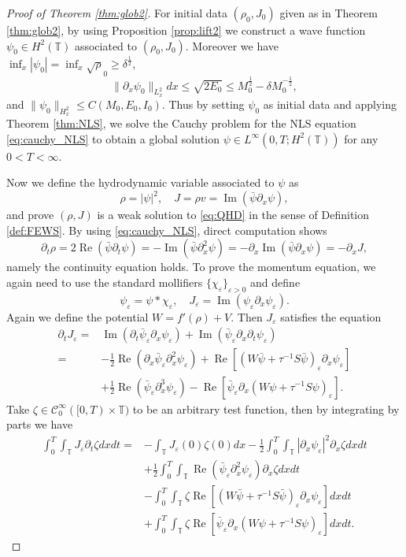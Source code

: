 \documentclass[leqno]{amsart}
\theoremstyle{plain}
\theoremstyle{definition}
\theoremstyle{remark}
\theoremstyle{plain}
\theoremstyle{plain}
\def\T{{\mathbb T}}%
\def\d{{\partial}}
\def\eps{\varepsilon}
\DeclareMathOperator{\RE}{Re}
\DeclareMathOperator{\IM}{Im}
\numberwithin{equation}{section}
\begin{document}
\begin{proof}[Proof of Theorem \ref{thm:glob2}]
For initial data $(\rho_0,J_0)$ given as in Theorem \ref{thm:glob2}, by using Proposition \ref{prop:lift2} we construct a wave function $\psi_0\in H^2(\T)$ associated to $(\rho_0,J_0)$. Moreover we have $\inf_x|\psi_0|=\inf_x\sqrt\rho_0\geq \delta^\frac12$,
\[
\|\d_x\psi_0\|_{L^2_x}dx \leq \sqrt{2E_0}\leq M_0^\frac12-\delta M_0^{-\frac12},
\]
and $\|\psi_0\|_{H^2_x}\leq C(M_0,E_0,I_0)$. Thus by setting $\psi_0$ as initial data and applying Theorem \ref{thm:NLS}, we solve the Cauchy problem for the NLS equation \eqref{eq:cauchy_NLS} to obtain a global solution $\psi\in L^\infty(0,T;H^2(\T))$ for any $0<T<\infty$. 

Now we define the hydrodynamic variable associated to $\psi$ as 
\[
\rho=|\psi|^2,\quad J=\rho v=\IM(\bar\psi\d_x\psi),
\]
and prove $(\rho, J)$ is a weak solution to \eqref{eq:QHD} in the sense of Definition \ref{def:FEWS}. By using \eqref{eq:cauchy_NLS}, direct computation shows
\[
\d_t\rho=2\RE(\bar\psi\d_t\psi)=-\IM(\bar\psi\d_x^2\psi)=-\d_x\IM(\bar\psi\d_x\psi)=-\d_xJ,
\]
namely the continuity equation holds. To prove the momentum equation, we again need to use the standard mollifiers $\{\chi_\eps\}_{\eps>0}$ and define 
\[
\psi_\eps=\psi\ast\chi_\eps,\quad J_\eps=\IM(\psi_\eps\d_x\psi_\eps).
\]
Again we define the potential $W=f'(\rho)+V$. Then $J_\eps$ satisfies the equation
\begin{align*}
\d_tJ_\eps=&\IM(\d_t\bar\psi_\eps\d_x\psi_\eps)+\IM(\bar\psi_\eps\d_x\d_t\psi_\eps)\\
=& -\frac12\RE(\d_x\bar\psi_\eps\d_x^2\psi_\eps)+\RE[(W\bar\psi+\tau^{-1}S\bar\psi)_\eps\d_x\psi_\eps]\\
&+\frac12\RE(\bar\psi_\eps\d_x^3\psi_\eps)-\RE[\bar\psi_\eps\d_x(W\psi+\tau^{-1}S\psi)_\eps].
\end{align*}
Take $\zeta\in\mathcal C^\infty_0([0, T)\times\T)$ to be an arbitrary test function, then by integrating by parts we have
\begin{align*}
\int_0^T\int_\T J_\eps \d_t\zeta dxdt=&-\int_\T J_\eps(0)\zeta(0)dx-\frac12\int_0^T\int_\T|\d_x\psi_\eps|^2\d_x\zeta dxdt\\
&+\frac12\int_0^T\int_\T\RE(\bar\psi_\eps\d_x^2\psi_\eps)\d_x\zeta dxdt\\
&-\int_0^T\int_\T \zeta\RE[(W\bar\psi+\tau^{-1}S\bar\psi)_\eps\d_x\psi_\eps] dxdt\\
&+\int_0^T\int_\T \zeta\RE[\bar\psi_\eps\d_x(W\psi+\tau^{-1}S\psi)_\eps]dxdt.
\end{align*}

\end{proof}
\end{document}
